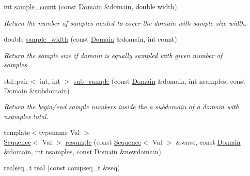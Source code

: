 \begin{DoxyCompactItemize}
\item 
int \hyperlink{namespace_wire_cell_1_1_waveform_a5f342071d33324064758877fb128e062}{sample\+\_\+count} (const \hyperlink{namespace_wire_cell_1_1_waveform_aa783b1c2a84242349d5c798b7483727b}{Domain} \&domain, double width)
\begin{DoxyCompactList}\small\item\em Return the number of samples needed to cover the domain with sample size width. \end{DoxyCompactList}\item 
double \hyperlink{namespace_wire_cell_1_1_waveform_a76b0099d7c51a9e0a915bbee0fe48069}{sample\+\_\+width} (const \hyperlink{namespace_wire_cell_1_1_waveform_aa783b1c2a84242349d5c798b7483727b}{Domain} \&domain, int count)
\begin{DoxyCompactList}\small\item\em Return the sample size if domain is equally sampled with given number of samples. \end{DoxyCompactList}\item 
std\+::pair$<$ int, int $>$ \hyperlink{namespace_wire_cell_1_1_waveform_a841c4668962007ef512b7a7df6ecfece}{sub\+\_\+sample} (const \hyperlink{namespace_wire_cell_1_1_waveform_aa783b1c2a84242349d5c798b7483727b}{Domain} \&domain, int nsamples, const \hyperlink{namespace_wire_cell_1_1_waveform_aa783b1c2a84242349d5c798b7483727b}{Domain} \&subdomain)
\begin{DoxyCompactList}\small\item\em Return the begin/end sample numbers inside the a subdomain of a domain with nsamples total. \end{DoxyCompactList}\item 
{\footnotesize template$<$typename Val $>$ }\\\hyperlink{namespace_wire_cell_1_1_waveform_a1d2a1b672e3b220dcd64a994531de95d}{Sequence}$<$ Val $>$ \hyperlink{namespace_wire_cell_1_1_waveform_ad08232b659cba09cf7174b900c557be5}{resample} (const \hyperlink{namespace_wire_cell_1_1_waveform_a1d2a1b672e3b220dcd64a994531de95d}{Sequence}$<$ Val $>$ \&wave, const \hyperlink{namespace_wire_cell_1_1_waveform_aa783b1c2a84242349d5c798b7483727b}{Domain} \&domain, int nsamples, const \hyperlink{namespace_wire_cell_1_1_waveform_aa783b1c2a84242349d5c798b7483727b}{Domain} \&newdomain)
\item 
\hyperlink{namespace_wire_cell_1_1_waveform_a479175e541c8545e87cd8063b74b6956}{realseq\+\_\+t} \hyperlink{namespace_wire_cell_1_1_waveform_a40f3344b248eea24a08d391e8f402bb8}{real} (const \hyperlink{namespace_wire_cell_1_1_waveform_a7e4a8d371f774438bb360e7d1dcb583a}{compseq\+\_\+t} \&seq)

\end{DoxyCompactItemize}

